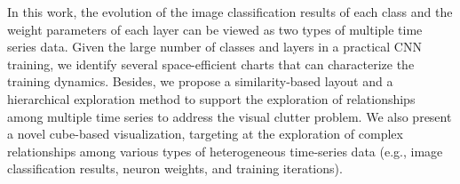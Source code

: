 \documentclass[format=acmsmall, review=false, screen=true]{acmart}
\begin{document}
In this work, the evolution of the image classification results of each class and the weight parameters of each layer can be viewed as two types of multiple time series data. Given the large number of classes and layers in a practical CNN training, we identify several space-efficient charts that can characterize the training dynamics. Besides, we propose a similarity-based layout and a hierarchical exploration method to support the exploration of relationships among multiple time series to address the visual clutter problem. We also present a novel cube-based visualization, targeting at the exploration of complex relationships among various types of heterogeneous time-series data (e.g., image classification results, neuron weights, and training iterations).

\end{document}
